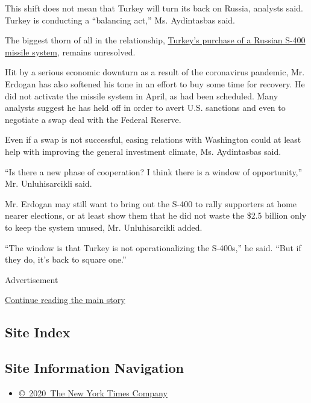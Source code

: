 This shift does not mean that Turkey will turn its back on Russia,
analysts said. Turkey is conducting a ``balancing act,'' Ms. Aydintasbas
said.

The biggest thorn of all in the relationship,
\href{https://www.nytimes.com/2019/07/12/world/russia-turkey-missile-explain.html}{Turkey's
purchase of a Russian S-400 missile system}, remains unresolved.

Hit by a serious economic downturn as a result of the coronavirus
pandemic, Mr. Erdogan has also softened his tone in an effort to buy
some time for recovery. He did not activate the missile system in April,
as had been scheduled. Many analysts suggest he has held off in order to
avert U.S. sanctions and even to negotiate a swap deal with the Federal
Reserve.

Even if a swap is not successful, easing relations with Washington could
at least help with improving the general investment climate, Ms.
Aydintasbas said.

``Is there a new phase of cooperation? I think there is a window of
opportunity,'' Mr. Unluhisarcikli said.

Mr. Erdogan may still want to bring out the S-400 to rally supporters at
home nearer elections, or at least show them that he did not waste the
\$2.5 billion only to keep the system unused, Mr. Unluhisarcikli added.

``The window is that Turkey is not operationalizing the S-400s,'' he
said. ``But if they do, it's back to square one.''

Advertisement

\protect\hyperlink{after-bottom}{Continue reading the main story}

\hypertarget{site-index}{%
\subsection{Site Index}\label{site-index}}

\hypertarget{site-information-navigation}{%
\subsection{Site Information
Navigation}\label{site-information-navigation}}

\begin{itemize}
\tightlist
\item
  \href{https://help.nytimes.com/hc/en-us/articles/115014792127-Copyright-notice}{©~2020~The
  New York Times Company}
\end{itemize}

